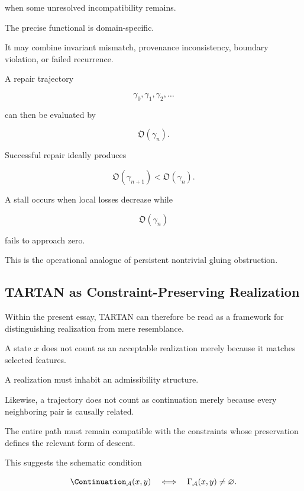 \documentclass[
  11pt,
  a4paper,
  DIV=12,
  BCOR=0mm,
  parskip=half-
]{scrartcl}
\theoremstyle{definition}
\theoremstyle{plain}
\theoremstyle{remark}
\begin{document}
when some unresolved incompatibility remains.

The precise functional is domain-specific.

It may combine invariant mismatch, provenance inconsistency, boundary
violation, or failed recurrence.

A repair trajectory

\[
  \gamma_0,
  \gamma_1,
  \gamma_2,
  \ldots
\]

can then be evaluated by

\[
  \mathfrak O(\gamma_n).
\]

Successful repair ideally produces

\[
  \mathfrak O(\gamma_{n+1})
  <
  \mathfrak O(\gamma_n).
\]

A stall occurs when local losses decrease while

\[
  \mathfrak O(\gamma_n)
\]

fails to approach zero.

This is the operational analogue of persistent nontrivial gluing obstruction.


\subsection{TARTAN as Constraint-Preserving Realization}
\label{app:tartan-interpretation}

Within the present essay, TARTAN can therefore be read as a framework for
distinguishing realization from mere resemblance.

A state \(x\) does not count as an acceptable realization merely because it
matches selected features.

A realization must inhabit an admissibility structure.

Likewise, a trajectory does not count as continuation merely because every
neighboring pair is causally related.

The entire path must remain compatible with the constraints whose preservation
defines the relevant form of descent.

This suggests the schematic condition

\[
  \Continuation_{\mathcal A}(x,y)
  \quad\Longleftrightarrow\quad
  \Gamma_{\mathcal A}(x,y)\neq\varnothing.
\]
\end{document}
